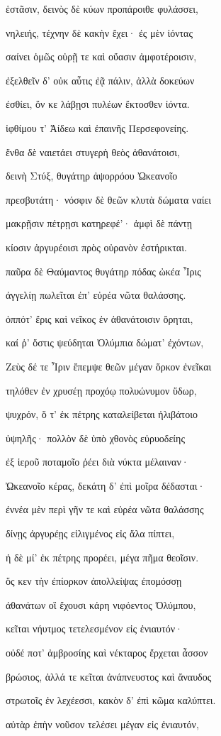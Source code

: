 \begin{pages}
\begin{Leftside}
ἑστᾶσιν, δεινὸς δὲ κύων προπάροιθε φυλάσσει, 

νηλειής, τέχνην δὲ κακὴν ἔχει· ἐς μὲν ἰόντας  

σαίνει ὁμῶς οὐρῇ τε καὶ οὔασιν ἀμφοτέροισιν,

ἐξελθεῖν δ' οὐκ αὖτις ἐᾷ πάλιν, ἀλλὰ δοκεύων

ἐσθίει, ὅν κε λάβῃσι πυλέων ἔκτοσθεν ἰόντα.

ἰφθίμου τ' Ἀίδεω καὶ ἐπαινῆς Περσεφονείης.

ἔνθα δὲ ναιετάει στυγερὴ θεὸς ἀθανάτοισι, 

δεινὴ Στύξ, θυγάτηρ ἀψορρόου Ὠκεανοῖο

πρεσβυτάτη· νόσφιν δὲ θεῶν κλυτὰ δώματα ναίει 

μακρῇσιν πέτρῃσι κατηρεφέ'· ἀμφὶ δὲ πάντῃ 

κίοσιν ἀργυρέοισι πρὸς οὐρανὸν ἐστήρικται.

παῦρα δὲ Θαύμαντος θυγάτηρ πόδας ὠκέα Ἶρις 

ἀγγελίῃ πωλεῖται ἐπ' εὐρέα νῶτα θαλάσσης. 

ὁππότ' ἔρις καὶ νεῖκος ἐν ἀθανάτοισιν ὄρηται, 

καί ῥ' ὅστις ψεύδηται Ὀλύμπια δώματ' ἐχόντων,

Ζεὺς δέ τε Ἶριν ἔπεμψε θεῶν μέγαν ὅρκον ἐνεῖκαι

τηλόθεν ἐν χρυσέῃ προχόῳ πολυώνυμον ὕδωρ,  

ψυχρόν, ὅ τ' ἐκ πέτρης καταλείβεται ἠλιβάτοιο 

ὑψηλῆς· πολλὸν δὲ ὑπὸ χθονὸς εὐρυοδείης 

ἐξ ἱεροῦ ποταμοῖο ῥέει διὰ νύκτα μέλαιναν· 

Ὠκεανοῖο κέρας, δεκάτη δ' ἐπὶ μοῖρα δέδασται· 

ἐννέα μὲν περὶ γῆν τε καὶ εὐρέα νῶτα θαλάσσης 

δίνῃς ἀργυρέῃς εἱλιγμένος εἰς ἅλα πίπτει,

ἡ δὲ μί' ἐκ πέτρης προρέει, μέγα πῆμα θεοῖσιν. 

ὅς κεν τὴν ἐπίορκον ἀπολλείψας ἐπομόσσῃ

ἀθανάτων οἳ ἔχουσι κάρη νιφόεντος Ὀλύμπου,

κεῖται νήυτμος τετελεσμένον εἰς ἐνιαυτόν·  

οὐδέ ποτ' ἀμβροσίης καὶ νέκταρος ἔρχεται ἆσσον

βρώσιος, ἀλλά τε κεῖται ἀνάπνευστος καὶ ἄναυδος

στρωτοῖς ἐν λεχέεσσι, κακὸν δ' ἐπὶ κῶμα καλύπτει.

αὐτὰρ ἐπὴν νοῦσον τελέσει μέγαν εἰς ἐνιαυτόν,


\end{Leftside}
\end{pages}
